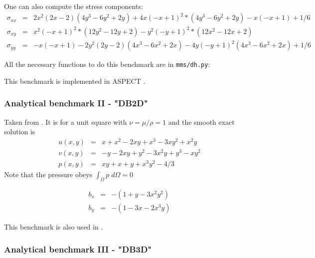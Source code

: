 One can also compute the stress components:
\begin{eqnarray}
\sigma_{xx} &=&  2x^2(2x - 2)(4y^3 - 6y^2 + 2y) + 4x(-x + 1)^2*(4y^3 - 6y^2 + 2y) - x(-x + 1) + 1/6 \\
\sigma_{xy} &=&  x^2(-x + 1)^2*(12y^2 - 12y + 2) - y^2(-y + 1)^2*(12x^2 - 12x + 2) \\
\sigma_{yy} &=&  -x(-x + 1) - 2y^2(2y - 2)(4x^3 - 6x^2 + 2x) - 4y(-y + 1)^2(4x^3 - 6x^2 + 2x) + 1/6
\end{eqnarray}

All the necessary functions to do this benchmark are in {\tt mms/dh.py}:


This benchmark is implemented in ASPECT \cite{aspectmanual}.

\subsubsection{Analytical benchmark II \label{mms2} - "DB2D"}

Taken from \cite{dobo04,bodg06}. It is for a unit square with $\nu=\mu/\rho=1$ and the smooth exact solution is
\begin{eqnarray}
u(x,y) &=& x+x^2 - 2xy+x^3 - 3xy^2 + x^2y \\
v(x,y) &=& -y-2xy+y^2 -3x^2y + y^3 - xy^2 \\
p(x,y) &=& xy+x+y+x^3y^2 - 4/3
\end{eqnarray}
Note that the pressure obeys $\int_{\Omega} p \; d\Omega = 0$

\begin{eqnarray}
b_x &=& - (1+y-3x^2y^2) \\
b_y &=& - (1-3x-2x^3y) 
\end{eqnarray}

This benchmark is also used in \cite{wosp14}.

\subsubsection{Analytical benchmark III \label{mms3} - "DB3D"}

